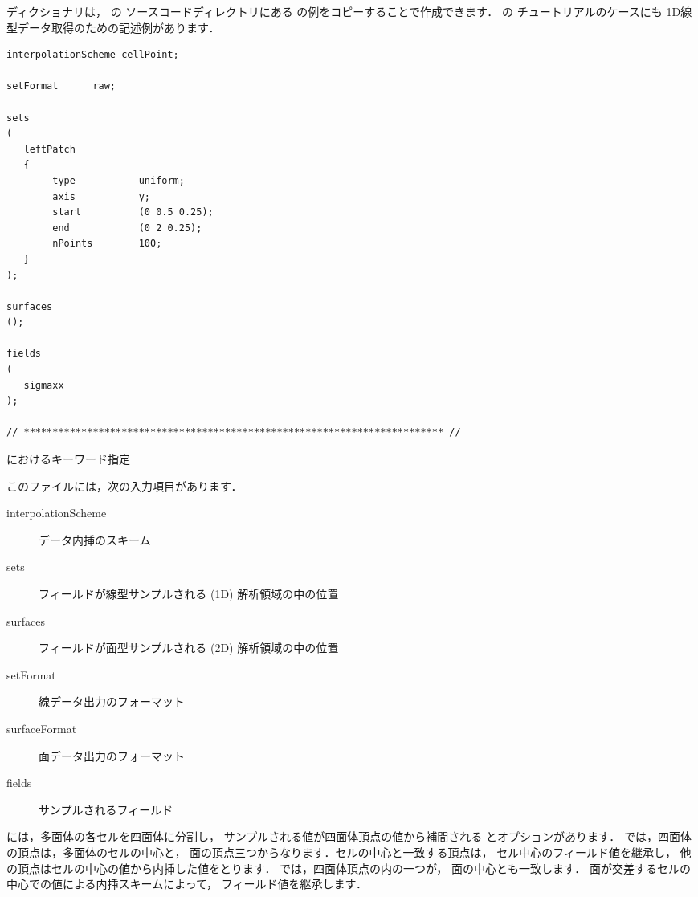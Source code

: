 ディクショナリは，
の
ソースコードディレクトリにある
\/の例をコピーすることで作成できます．
\/の
チュートリアルのケースにも
1D線型データ取得のための記述例があります．
\begin{OFfile}
\begin{verbatim}
interpolationScheme cellPoint;

setFormat      raw;

sets
(
   leftPatch
   {
        type           uniform;
        axis           y;
        start          (0 0.5 0.25);
        end            (0 2 0.25);
        nPoints        100;
   }
);

surfaces
();

fields
(
   sigmaxx
);

// ************************************************************************* //
\end{verbatim}
\end{OFfile}


\begin{table}[ht]
 
 \caption{におけるキーワード指定}
 \label{tbl:6.3}
\end{table}


このファイルには，次の入力項目があります．
\begin{description}
 \item[interpolationScheme] データ内挿のスキーム
 \item[sets] フィールドが線型サンプルされる (1D) 解析領域の中の位置
 \item[surfaces] フィールドが面型サンプルされる (2D) 解析領域の中の位置
 \item[setFormat] 線データ出力のフォーマット
 \item[surfaceFormat] 面データ出力のフォーマット
 \item[fields] サンプルされるフィールド
\end{description}

には，多面体の各セルを四面体に分割し，
サンプルされる値が四面体頂点の値から補間される
とオプションがあります．
では，四面体の頂点は，多面体のセルの中心と，
面の頂点三つからなります．セルの中心と一致する頂点は，
セル中心のフィールド値を継承し，
他の頂点はセルの中心の値から内挿した値をとります．
では，四面体頂点の内の一つが，
面の中心とも一致します．
面が交差するセルの中心での値による内挿スキームによって，
フィールド値を継承します．

